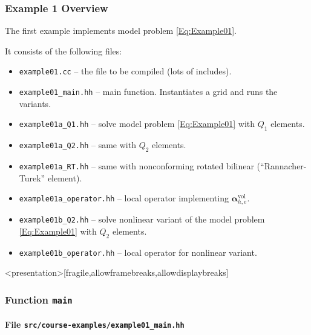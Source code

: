 \begin{frame}
\frametitle{Example 1 Overview}
The first example implements model problem \eqref{Eq:Example01}.

It consists of the following files:
\begin{itemize}
\item \lstinline{example01.cc} -- the file to be compiled (lots of includes). 
\item \lstinline{example01_main.hh} -- main function. Instantiates a grid and runs the variants.
\item \lstinline{example01a_Q1.hh} -- solve model problem \eqref{Eq:Example01} with $Q_1$ elements.
\item \lstinline{example01a_Q2.hh} -- same with $Q_2$ elements.
\item \lstinline{example01a_RT.hh} -- same with nonconforming rotated bilinear (``Rannacher-Turek'' element).
\item \lstinline{example01a_operator.hh} -- local operator implementing $\bm{\alpha}_{h,e}^{\text{vol}}$.
\item \lstinline{example01b_Q2.hh} -- solve nonlinear variant of the model problem \eqref{Eq:Example01} with $Q_2$ elements.
\item \lstinline{example01b_operator.hh} -- local operator for nonlinear variant.
\end{itemize}
\end{frame}

\begin{frame}<presentation>[fragile,allowframebreaks,allowdisplaybreaks]
\frametitle<presentation>{Function \lstinline{main}}
\framesubtitle<presentation>{File \texttt{src/course-examples/example01\_main.hh}}

\end{frame}


